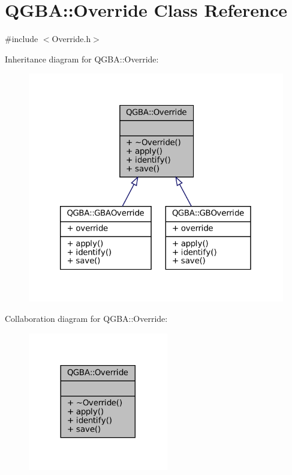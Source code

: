 \hypertarget{class_q_g_b_a_1_1_override}{}\section{Q\+G\+BA\+:\+:Override Class Reference}
\label{class_q_g_b_a_1_1_override}


{\ttfamily \#include $<$Override.\+h$>$}



Inheritance diagram for Q\+G\+BA\+:\+:Override\+:
\nopagebreak
\begin{figure}[H]
\begin{center}
\leavevmode
\includegraphics[width=320pt]{class_q_g_b_a_1_1_override__inherit__graph}
\end{center}
\end{figure}


Collaboration diagram for Q\+G\+BA\+:\+:Override\+:
\nopagebreak
\begin{figure}[H]
\begin{center}
\leavevmode
\includegraphics[width=173pt]{class_q_g_b_a_1_1_override__coll__graph}
\end{center}
\end{figure}
